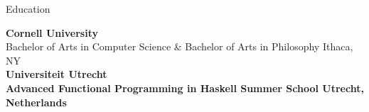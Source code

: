 
\begin{rSection}{Education}

	{\bf \large{Cornell University}} \hfill \color{darkgray}{08/2021 - 05/2025}
	\\ 
	Bachelor of Arts in Computer Science \& Bachelor of Arts in Philosophy \hfill Ithaca, NY \\
	\bf \small{Universiteit Utrecht} \hfill {}
	\\ 
	\small{Advanced Functional Programming in Haskell Summer School} \hfill {\small{Utrecht, Netherlands}}

	\color{black}

\end{rSection}